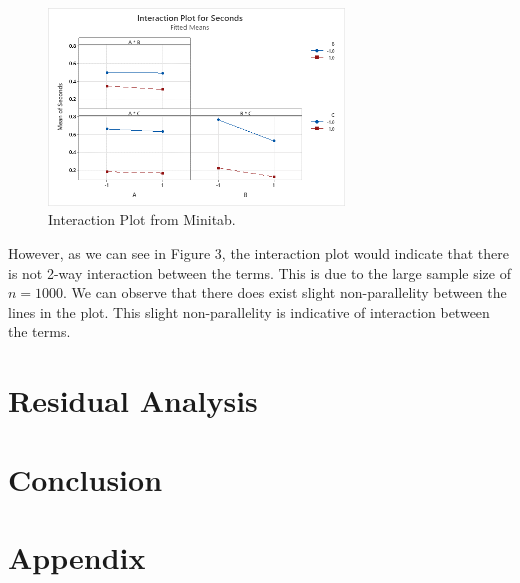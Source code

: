 \documentclass{article}
\begin{document}
\clearpage
\begin{figure}[h] %
  \centering
  \includegraphics[width=0.7\textwidth]{./images/interaction.png}
  \caption{Interaction Plot from Minitab.}
  \label{fig:interaction}
\end{figure}
However, as we can see in Figure 3, the interaction plot would indicate that there is not 2-way interaction between the terms.
This is due to the large sample size of $n=1000$. We can observe that there does exist slight non-parallelity between the lines in the plot.
This slight non-parallelity is indicative of interaction between the terms.
\section*{Residual Analysis}

\section*{Conclusion}


\clearpage
\appendix
\section*{Appendix}
\end{document}
